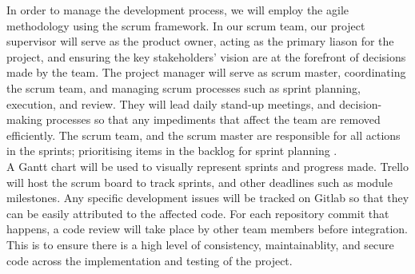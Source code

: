 
In order to manage the development process, we will employ the agile methodology using the scrum framework. In our scrum team, our project supervisor will serve as the product owner, acting as the primary liason for the project, and ensuring the key stakeholders' vision are at the forefront of decisions made by the team. The project manager will serve as scrum master, coordinating the scrum team, and managing scrum processes such as sprint planning, execution, and review. They will lead daily stand-up meetings, and decision-making processes so that any impediments that affect the team are removed efficiently. The scrum team, and the scrum master are responsible for all actions in the sprints; prioritising items in the backlog for sprint planning \cite{scrumroles}.\\

A Gantt chart will be used to visually represent sprints and progress made. Trello will host the scrum board to track sprints, and other deadlines such as module milestones. Any specific development issues will be tracked on Gitlab so that they can be easily attributed to the affected code. For each repository commit that happens, a code review will take place by other team members before integration. This is to ensure there is a high level of consistency, maintainablity, and secure code across the implementation and testing of the project. 